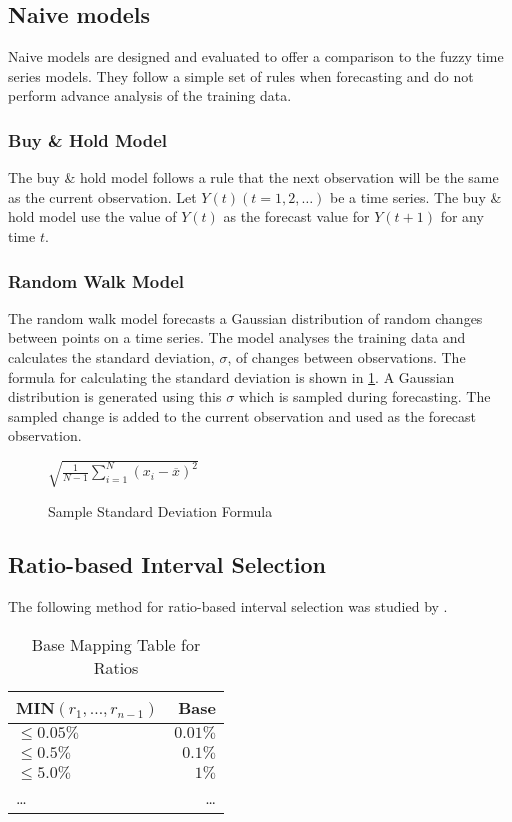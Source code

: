 \documentclass[12pt, oneside, a4paper]{article}
\theoremstyle{definition}
\begin{document}
\subsection{Naive models}

Naive models are designed and evaluated to offer a comparison to the fuzzy time series models. They follow a simple set of rules when forecasting and do not perform advance analysis of the training data.

\subsubsection{Buy \& Hold Model}

The buy \& hold model follows a rule that the next observation will be the same as the current observation. Let $Y(t)(t=1,2,\ldots)$ be a time series. The buy \& hold model use the value of $Y(t)$ as the forecast value for $Y(t+1)$ for any time $t$.

\subsubsection{Random Walk Model}

The random walk model forecasts a Gaussian distribution of random changes between points on a time series. The model analyses the training data and calculates the standard deviation, $\sigma$, of changes between observations. The formula for calculating the standard deviation is shown in \cref{stdev}. A Gaussian distribution is generated using this $\sigma$ which is sampled during forecasting. The sampled change is added to the current observation and used as the forecast observation.

\begin{figure}[H]
    \centering
    \caption{Sample Standard Deviation Formula}
    $\sqrt{\frac{1}{N-1} \sum_{i=1}^N (x_i - \overline{x})^2}$
    \label{stdev}
\end{figure}

\subsection{Ratio-based Interval Selection}
\label{ratio}

The following method for ratio-based interval selection was studied by \cite{huarng2006ratio}.

\begin{table}[H]
	\center
	\begin{tabularx}{0.5\textwidth}{ X R }
	\hline
  	MIN$(r_1,\ldots,r_{n-1})$ & Base\\
  	\hline 
  	\noalign{\smallskip}
	$\leq 0.05\%$ & $0.01\%$ \\
	$\leq 0.5\%$ & $0.1\%$ \\
	$\leq 5.0\%$ & $1\%$ \\
	\ldots & \ldots \\
	\hline
	\end{tabularx}
	\caption{Base Mapping Table for Ratios}
\end{table}
\end{document}
